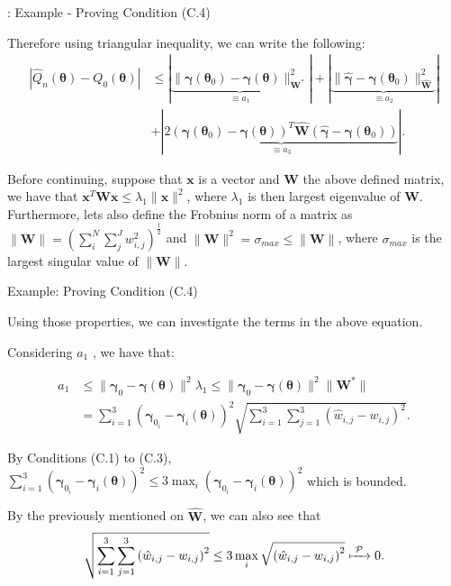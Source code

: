 \documentclass[envcountsect,usenames,dvipsnames]{beamer}
\def\btheta{\bm \theta}
\def\bgamma{\bm \gamma}
\def\W{\mathbf{W}}
\theoremstyle{mystyle}
\begin{document}
\begin{frame}{\thesubsection: Example - Proving Condition {\color{beamer@UIUCblue}(C.4)}}

Therefore using triangular inequality, we can write the following:
\begin{equation*}
    \begin{aligned}
      |\hat{Q}_n (\btheta) - {Q}_0 (\btheta)| &\leq \left| \underbrace{\|\bgamma(\btheta_0) - \bgamma (\btheta) \|_{{\W}^*}^2}_{\equiv a_1} \right| + \left| \underbrace{\|\hat{\bgamma} - \bgamma(\btheta_0)  \|_{\widehat{\W}}^2}_{\equiv a_2} \right| \\ &+ \left| \underbrace{2 \left( \bgamma(\btheta_0) - \bgamma (\btheta)\right)^T \widehat{\W} \left( \hat{\bgamma} - \bgamma(\btheta_0)\right)}_{\equiv a_3}\right|.     
    \end{aligned}
\end{equation*}

Before continuing, suppose that  $\bm{x}$ is a vector and $\W$ the above defined matrix, we have that $\bm{x}^T \W \bm{x} \leq \lambda_1 \|\bm{x}\|^2$, where $\lambda_1$ is then largest eigenvalue of $\W$. Furthermore, lets also define the Frobnius norm of a matrix as $\|\W\| = (\sum_i^N \sum_j^J w_{i,j}^2)^{\frac{1}{2}}$ and $\|\W\|^2 = \sigma_{max} \leq \|\W\|$, where $\sigma_{max}$ is the largest singular value of $\|\W\|$.

\end{frame}

\begin{frame}{Example: Proving Condition {\color{beamer@UIUCblue}(C.4)}}

Using those properties, we can investigate the terms in the above equation. 

Considering $a_1$ , we have that:

\begin{equation*}
\begin{aligned}
     a_1 &\leq \|\bgamma_0 - \bgamma (\btheta) \|^2 \lambda_1  \leq \|\bgamma_0 - \bgamma (\btheta) \|^2 \|\W^*\| \\ &= \sum^3_{i = 1} \left(\bgamma_{0_i} - \bgamma_i (\btheta)\right)^2  \sqrt{\sum^3_{i = 1} \sum^3_{j = 1} \left(\hat{w}_{i,j} - w_{i,j}\right)^2}    .
\end{aligned}
\end{equation*}

By Conditions {\color{beamer@UIUCblue}(C.1)} to {\color{beamer@UIUCblue}(C.3)},  $\sum^3_{i = 1} \left(\bgamma_{0_i} - \bgamma_i (\btheta)\right)^2 \leq 3 \max_i \left(\bgamma_{0_i} - \bgamma_i (\btheta)\right)^2 $ which is bounded.

By the previously mentioned on $\widehat{\W}$, we can also see that 
\begin{equation*}
    \sqrt{\sum^3_{i = 1} \sum^3_{j = 1} \left(\hat{w}_{i,j} - w_{i,j}\right)^2} \leq 3 \max_i\sqrt{\left(\hat{w}_{i,j} - w_{i,j}\right)^2} \xmapsto[\;\;\;\;\; ]{\mathcal{P}} 0.
\end{equation*}

\end{frame}
\end{document}

